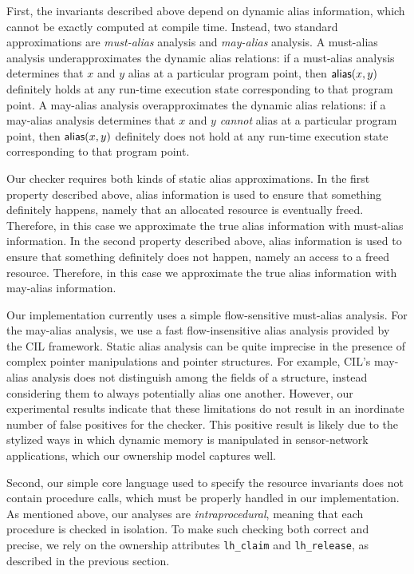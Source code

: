 First, the invariants described above depend on dynamic alias
information, which cannot be exactly computed at compile time.
Instead, two standard approximations are {\em must-alias} analysis and
{\em may-alias} analysis.  A must-alias analysis underapproximates the
dynamic alias relations:  if a must-alias analysis determines that $x$
and $y$ alias at a particular program point, then ${\mathsf{alias}}(x,y)$
definitely holds at any run-time execution state corresponding to that
program point.  A may-alias analysis overapproximates the dynamic
alias relations:  if a may-alias analysis determines that $x$ and $y$
{\em cannot} alias at a particular program point, then ${\mathsf{alias}}(x,y)$
definitely does not hold at any run-time execution state corresponding
to that program point.

Our checker requires both kinds of static alias approximations.  In
the first property described above, alias information is used to
ensure that something definitely happens, namely that an allocated
resource is eventually freed.  Therefore, in this case we approximate
the true alias information with must-alias information.  In the second
property described above, alias information is used to ensure that
something definitely does not happen, namely an access to a freed
resource.  Therefore, in this case we approximate the true alias
information with may-alias information.

Our implementation currently uses a simple flow-sensitive must-alias
analysis.  For the may-alias analysis, we use a fast flow-insensitive
alias analysis provided by the CIL framework.  Static alias analysis
can be quite imprecise in the presence of complex pointer
manipulations and pointer structures.  For example, CIL's may-alias
analysis does not distinguish among the fields of a structure, instead
considering them to always potentially alias one another.  However,
our experimental results indicate that these limitations do not result
in an inordinate number of false positives for the checker.  
%
%
This positive result is likely due to the stylized ways in which
dynamic memory is manipulated in sensor-network applications, which
our ownership model captures well.  

Second, our simple core language used to specify the resource
invariants does not contain procedure calls, which must be properly
handled in our implementation.  As mentioned above, our analyses are
{\em intraprocedural}, meaning that each procedure is checked in
isolation.  To make such checking both correct and precise, we rely on
the ownership attributes {\tt lh\_claim} and {\tt lh\_release}, as
described in the previous section.

